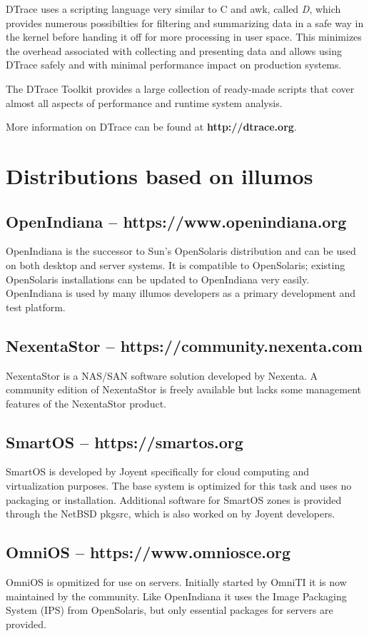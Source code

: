 \documentclass[11pt,foldmark,notumble]{leaflet}
\begin{document}
DTrace uses a scripting language very similar to C and awk, called
\emph{D}, which provides numerous possibilties for filtering and
summarizing data in a safe way in the kernel before handing it off for
more processing in user space. This minimizes the overhead associated
with collecting and presenting data and allows using DTrace
safely and with minimal performance impact on production systems.

The DTrace Toolkit provides a large collection of ready-made scripts
that cover almost all aspects of performance and runtime system
analysis.

More information on DTrace can be found at \textbf{http://dtrace.org}.

\section{Distributions based on illumos}
\subsection{OpenIndiana -- https://www.openindiana.org}
OpenIndiana is the successor to Sun's OpenSolaris distribution and can
be used on both desktop and server systems. It is compatible to
OpenSolaris; existing OpenSolaris installations can be updated to
OpenIndiana very easily. OpenIndiana is used by many illumos
developers as a primary development and test platform.

\subsection{NexentaStor -- https://community.nexenta.com}
NexentaStor is a NAS/SAN software solution developed by Nexenta. A
community edition of NexentaStor is freely available but lacks some
management features of the NexentaStor product.

\subsection{SmartOS -- https://smartos.org}
SmartOS is developed by Joyent specifically for cloud computing and
virtualization purposes. The base system is optimized for this task
and uses no packaging or installation. Additional software for
SmartOS zones is provided through the NetBSD pkgsrc, which is also
worked on by Joyent developers.

\subsection{OmniOS -- https://www.omniosce.org}
OmniOS is opmitized for use on servers. Initially started by OmniTI
it is now maintained by the community. Like OpenIndiana
it uses the Image Packaging System (IPS) from OpenSolaris, but only
essential packages for servers are provided.
\end{document}
